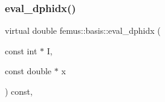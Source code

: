 \mbox{\label{classfemus_1_1basis_a4db7d29cf8a753ddbccc4a297dafa0bf}} 
\subsubsection{\texorpdfstring{eval\+\_\+dphidx()}{eval\_dphidx()}\hspace{0.1cm}{\footnotesize\ttfamily [2/2]}}
{\footnotesize\ttfamily virtual double femus\+::basis\+::eval\+\_\+dphidx (\begin{DoxyParamCaption}\item[{const int $\ast$}]{I,  }\item[{const double $\ast$}]{x }\end{DoxyParamCaption}) const\hspace{0.3cm}{\ttfamily [inline]}, {\ttfamily [virtual]}}



